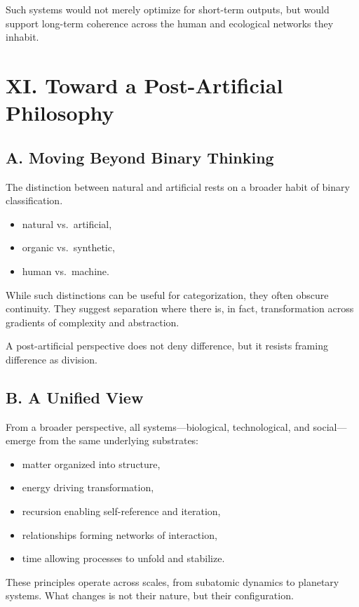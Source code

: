 \documentclass[12pt]{article}
\begin{document}
Such systems would not merely optimize for short-term outputs, but would support long-term coherence across the human and ecological networks they inhabit.

\section*{XI. Toward a Post-Artificial Philosophy}

\subsection*{A. Moving Beyond Binary Thinking}

The distinction between natural and artificial rests on a broader habit of binary classification.

\begin{itemize}
    \item natural vs.\ artificial,
    \item organic vs.\ synthetic,
    \item human vs.\ machine.
\end{itemize}

While such distinctions can be useful for categorization, they often obscure continuity. They suggest separation where there is, in fact, transformation across gradients of complexity and abstraction.

A post-artificial perspective does not deny difference, but it resists framing difference as division.

\subsection*{B. A Unified View}

From a broader perspective, all systems—biological, technological, and social—emerge from the same underlying substrates:

\begin{itemize}
    \item matter organized into structure,
    \item energy driving transformation,
    \item recursion enabling self-reference and iteration,
    \item relationships forming networks of interaction,
    \item time allowing processes to unfold and stabilize.
\end{itemize}

These principles operate across scales, from subatomic dynamics to planetary systems. What changes is not their nature, but their configuration.
\end{document}
